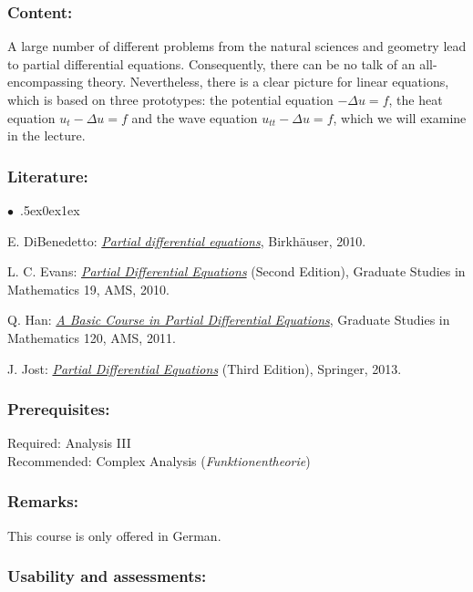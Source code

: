\documentclass[a4paper,10pt]{article}
\renewenvironment{itemize}{\begin{list}{$\bullet$\ }{\itemsep.5ex\setlength{\topsep}{0.5\itemsep}\parsep0ex\labelsep1ex\settowidth{\labelwidth}{$\bullet$\ }\setlength{\leftmargin}{\labelwidth}\addtolength{\leftmargin}{3ex}\addtolength{\leftmargin}{\labelsep}}}{\end{list}}
\begin{document}
\subsubsection*{\large
    Content:
}
A large number of different problems from the natural sciences and geometry lead to partial differential equations. Consequently, there can be no talk of an all-encompassing theory. Nevertheless, there is a clear picture for linear equations, which is based on three prototypes: the potential equation $-\Delta u = f$, the heat equation $u_t - \Delta u = f$ and the wave equation $u_{tt} - \Delta u = f$, which we will examine in the lecture.
\subsubsection*{\large
    Literature:
}
\begin{itemize}
\item
E. DiBenedetto: \href{https://link.springer.com/book/10.1007/978-0-8176-4552-6}{\emph{Partial differential equations}}, Birkhäuser, 2010. 
\item
L. C. Evans: \href{http://home.ustc.edu.cn/\~xushijie/pdf/textbooks/pde-evans.pdf}{\emph{Partial Differential Equations}} (Second Edition), Graduate Studies in Mathematics 19, AMS, 2010.
\item
Q. Han: \href{https://pdfcoffee.com/a-basic-course-in-partial-differential-equations-qing-han-pdf-free.html}{\emph{A Basic Course in Partial Differential Equations}}, Graduate Studies in Mathematics 120, AMS, 2011. 
\item
J. Jost: \href{http://www.redi-bw.de/start/unifr/EBooks-springer/10.1007/978-1-4614-4809-9}{\emph{Partial Differential Equations}} (Third Edition), Springer, 2013. 
\end{itemize}
\subsubsection*{\large
    Prerequisites:
}
Required: Analysis III \\
Recommended: Complex Analysis ({\em Funktionentheorie})
\subsubsection*{\large
    Remarks:
}
This course is only offered in German.
\cleardoublepage
\subsubsection*{\large
    Usability and assessments:
}
\end{document}
